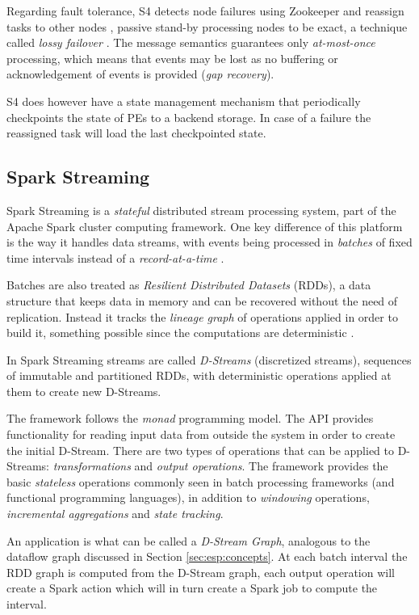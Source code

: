 \documentclass[ppgc,diss,english]{iiufrgs}
\begin{document}
Regarding fault tolerance, S4 detects node failures using Zookeeper and reassign tasks to other nodes \cite{bockermann2014survey}, passive stand-by processing nodes to be exact, a technique called \emph{lossy failover} \cite{kamburugamuvesurvey}. The message semantics guarantees only \emph{at-most-once} processing, which means that events may be lost as no buffering or acknowledgement of events is provided (\emph{gap recovery}).

S4 does however have a state management mechanism that periodically checkpoints the state of PEs to a backend storage. In case of a failure the reassigned task will load the last checkpointed state.

\subsection{Spark Streaming}

Spark Streaming is a \emph{stateful} distributed stream processing system, part of the Apache Spark cluster computing framework. One key difference of this platform is the way it handles data streams, with events being processed in \emph{batches} of fixed time intervals instead of a \emph{record-at-a-time} \cite{spark2015docs}.

Batches are also treated as \emph{Resilient Distributed Datasets} (RDDs), a data structure that keeps data in memory and can be recovered without the need of replication. Instead it tracks the \emph{lineage graph} of operations applied in order to build it, something possible since the computations are deterministic \cite{zaharia2013discretized}.

In Spark Streaming streams are called \emph{D-Streams} (discretized streams), sequences of immutable and partitioned RDDs, with deterministic operations applied at them to create new D-Streams.

The framework follows the \emph{monad} programming model. The API provides functionality for reading input data from outside the system in order to create the initial D-Stream. There are two types of operations that can be applied to D-Streams: \emph{transformations} and \emph{output operations}. The framework provides the basic \emph{stateless} operations commonly seen in batch processing frameworks (and functional programming languages), in addition to \emph{windowing} operations, \emph{incremental aggregations} and \emph{state tracking}.

An application is what can be called a \emph{D-Stream Graph}, analogous to the dataflow graph discussed in Section \ref{sec:esp:concepts}. At each batch interval the RDD graph is computed from the D-Stream graph, each output operation will create a Spark action which will in turn create a Spark job to compute the interval.
\end{document}
